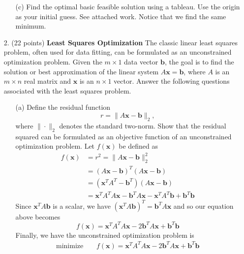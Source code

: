 \documentclass{article}
\begin{document}
\begin{itemize}
\begin{itemize}
        
        
        
        \item[(c)] Find the optimal basic feasible solution using a tableau. Use the origin as your initial guess.
        \newline\newline
        See attached work. Notice that we find the same minimum.
        \newline\newline
    \end{itemize}

    \item[2.] (22 points) \textbf{Least Squares Optimization}
    \newline\newline
    The classic linear least squares problem, often used for data fitting, can be formulated as an unconstrained optimization problem. Given the $m \times 1$ data vector $\mathbf{b}$, the goal is to find the solution or best approximation of the linear system $A\mathbf{x} = \mathbf{b}$, where $A$ is an $m \times n$ real matrix and $\mathbf{x}$ is an $n\times 1$ vector. Answer the following questions associated with the least squares problem.

    \begin{itemize}
        \item[(a)] Define the residual function
        \[r = \|A\mathbf{x} - \mathbf{b}\|_2,\]
        where $\| \cdot \|_2$ denotes the standard two-norm. Show that the residual squared can be formulated as an objective function of an unconstrained optimization problem.
        \newline\newline
        Let $f(\mathbf{x})$ be defined as
        \begin{align*}
            f(\mathbf{x}) &= r^2 = \|A\mathbf{x} - \mathbf{b}\|_2^2 \\
            &= (A\mathbf{x} - \mathbf{b})^T(A\mathbf{x} - \mathbf{b}) \\
            &= (\mathbf{x}^TA^T - \mathbf{b}^T)(A\mathbf{x} - \mathbf{b})\\
            &= \mathbf{x}^TA^TA\mathbf{x} - \mathbf{b}^TA\mathbf{x} - \mathbf{x}^TA^T\mathbf{b} + \mathbf{b}^T\mathbf{b}
        \end{align*}
        Since $\mathbf{x}^TA\mathbf{b}$ is a scalar, we have $(\mathbf{x}^TA\mathbf{b})^T = \mathbf{b}^TA\mathbf{x}$ and so our equation above becomes
        \[f(\mathbf{x}) = \mathbf{x}^TA^TA\mathbf{x} - 2\mathbf{b}^TA\mathbf{x} + \mathbf{b}^T\mathbf{b}\]
        Finally, we have the unconstrained optimization problem is 
        \begin{align*}
            \text{minimize} \:\:\:\:\: &f(\mathbf{x}) = \mathbf{x}^TA^TA\mathbf{x} - 2\mathbf{b}^TA\mathbf{x} + \mathbf{b}^T\mathbf{b}
        \end{align*}
        


\end{itemize}
\end{itemize}
\end{document}
